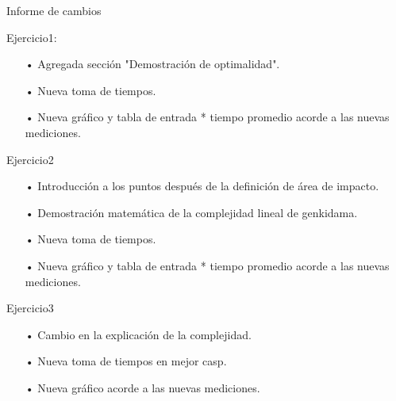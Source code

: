 \documentclass[10pt,a4paper]{article}
\begin{document}
\par{Informe de cambios}
\\
\par{Ejercicio1:
\begin{itemize}
\item[•] Agregada sección "Demostración de optimalidad".
\item[•] Nueva toma de tiempos.
\item[•] Nueva gráfico y tabla de entrada * tiempo promedio acorde a las nuevas mediciones.
\end{itemize}
}

\par{Ejercicio2
\begin{itemize}
\item[•] Introducción a los puntos después de la definición de área de impacto.
\item[•] Demostración matemática de la complejidad lineal de genkidama.
\item[•] Nueva toma de tiempos.
\item[•] Nueva gráfico y tabla de entrada * tiempo promedio acorde a las nuevas mediciones.
\end{itemize}
}

\par{Ejercicio3
\begin{itemize}
\item[•] Cambio en la explicación de la complejidad.
\item[•] Nueva toma de tiempos en mejor casp.
\item[•] Nueva gráfico acorde a las nuevas mediciones.
\end{itemize}
}
\end{document}
